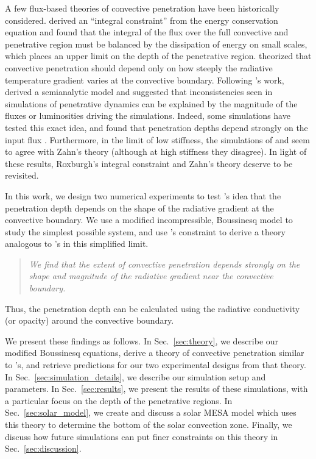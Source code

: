 \documentclass{aastex631}
\begin{document}
A few flux-based theories of convective penetration have been historically considered.
\citet{roxburgh1978, roxburgh1989, roxburgh1992, roxburgh1998} derived an ``integral constraint'' from the energy conservation equation and found that the integral of the flux over the full convective and penetrative region must be balanced by the dissipation of energy on small scales, which places an upper limit on the depth of the penetrative region.
\citet{zahn1991} theorized that convective penetration should depend only on how steeply the radiative temperature gradient varies at the convective boundary.
Following \citet{zahn1991}'s work, \citet{rempel2004} derived a semianalytic model and suggested that inconsistencies seen in simulations of penetrative dynamics can be explained by the magnitude of the fluxes or luminosities driving the simulations.
Indeed, some simulations have tested this exact idea, and found that penetration depths depend strongly on the input flux \citep{singh_etal_1998, kapyla_etal_2007, tian_etal_2009, hotta2017, kapyla2019}.
Furthermore, in the limit of low stiffness, the simulations of \citet{hurlburt_etal_1994} and \citet{rogers_etal_2006} seem to agree with Zahn's theory (although at high stiffness they disagree).
In light of these results, Roxburgh's integral constraint and Zahn's theory deserve to be revisited.

In this work, we design two numerical experiments to test \citet{zahn1991}'s idea that the penetration depth depends on the shape of the radiative gradient at the convective boundary.
We use a modified incompressible, Boussinesq model to study the simplest possible system, and use \citet{roxburgh1989}'s constraint to derive a theory analogous to \citet{zahn1991}'s in this simplified limit.
\begin{quote}
\emph{
We find that the extent of convective penetration depends strongly on the shape and magnitude of the radiative gradient near the convective boundary.
}
\end{quote}
Thus, the penetration depth can be calculated using the radiative conductivity (or opacity) around the convective boundary.

We present these findings as follows.
In Sec.~\ref{sec:theory}, we describe our modified Boussinesq equations, derive a theory of convective penetration similar to \citet{zahn1991}'s, and retrieve predictions for our two experimental designs from that theory.
In Sec.~\ref{sec:simulation_details}, we describe our simulation setup and parameters.
In Sec.~\ref{sec:results}, we present the results of these simulations, with a particular focus on the depth of the penetrative regions.
In Sec.~\ref{sec:solar_model}, we create and discuss a solar MESA model which uses this theory to determine the bottom of the solar convection zone.
Finally, we discuss how future simulations can put finer constraints on this theory in Sec.~\ref{sec:discussion}.
\end{document}
